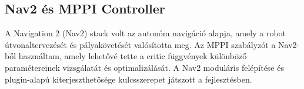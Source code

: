 \subsection{Nav2 és MPPI Controller}
A Navigation 2 (Nav2) stack volt az autonóm navigáció alapja, amely a robot útvonaltervezését és pályakövetését valósította meg. Az MPPI szabályzót a Nav2-ből használtam, amely lehetővé tette a critic függvények különböző paramétereinek vizsgálatát és optimalizálását. A Nav2 moduláris felépítése és plugin-alapú kiterjeszthetősége kulcsszerepet játszott a fejlesztésben.

